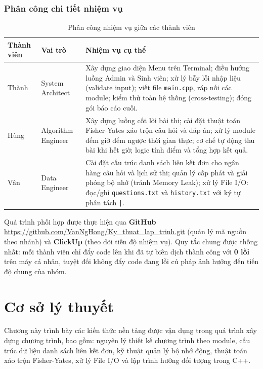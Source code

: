 \documentclass[11pt]{report}
\begin{document}
\subsection{Phân công chi tiết nhiệm vụ}

\begin{table}[H]
    \centering
    \begin{tabularx}{\textwidth}{|l|l|>{\raggedright\arraybackslash}X|} \hline
        \textbf{Thành viên} & \textbf{Vai trò} & \textbf{Nhiệm vụ cụ thể} \\ \hline
        Thành & System Architect & Xây dựng giao diện Menu trên Terminal; điều hướng luồng Admin và Sinh viên; xử lý bẫy lỗi nhập liệu (validate input); viết file \texttt{main.cpp}, ráp nối các module; kiểm thử toàn hệ thống (cross-testing); đóng gói báo cáo cuối. \\ \hline
        Hùng & Algorithm Engineer & Xây dựng luồng cốt lõi bài thi; cài đặt thuật toán Fisher-Yates xáo trộn câu hỏi và đáp án; xử lý module đếm giờ đếm ngược thời gian thực; cơ chế tự động thu bài khi hết giờ; logic tính điểm và tổng hợp kết quả. \\ \hline
        Vân & Data Engineer & Cài đặt cấu trúc danh sách liên kết đơn cho ngân hàng câu hỏi và lịch sử thi; quản lý cấp phát và giải phóng bộ nhớ (tránh Memory Leak); xử lý File I/O: đọc/ghi \texttt{questions.txt} và \texttt{history.txt} với ký tự phân tách \texttt{|}. \\ \hline
    \end{tabularx}
    \caption{Phân công nhiệm vụ giữa các thành viên}
    \label{tab:phancong}
\end{table}

Quá trình phối hợp được thực hiện qua \textbf{GitHub} \url{https://github.com/VanNgHong/Ky_thuat_lap_trinh.git} (quản lý mã nguồn theo nhánh) và \textbf{ClickUp} (theo dõi tiến độ nhiệm vụ). Quy tắc chung được thống nhất: mỗi thành viên chỉ đẩy code lên khi đã tự biên dịch thành công với \textbf{0 lỗi} trên máy cá nhân, tuyệt đối không đẩy code đang lỗi cú pháp ảnh hưởng đến tiến độ chung của nhóm.

\newpage
\chapter{Cơ sở lý thuyết}
\label{chap:lythuyet}

Chương này trình bày các kiến thức nền tảng được vận dụng trong quá trình xây dựng chương trình, bao gồm: nguyên lý thiết kế chương trình theo module, cấu trúc dữ liệu danh sách liên kết đơn, kỹ thuật quản lý bộ nhớ động, thuật toán xáo trộn Fisher-Yates, xử lý File I/O và lập trình hướng đối tượng trong C++.
\end{document}
